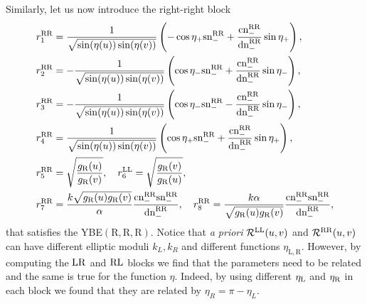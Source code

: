\documentclass[12pt,a4paper]{article}
\numberwithin{equation}{section}
\newcommand{\lR}{\mathcal{R}}
\newcommand{\tR}{\text{R}}
\begin{document}
Similarly, let us now introduce the right-right block
%
\begin{align}
&r_1^{{\rm RR}}=\frac{1}{\sqrt{\sin(\eta(u))\sin(\eta(v))}}\left(-\cos\eta_+\text{sn}^{{\rm RR}}_-+\frac{\text{cn}^{{\rm RR}}_-}{\text{dn}^{{\rm RR}}_-}\sin\eta_+\right),\nonumber\\
&r_2^{{\rm RR}}=-\frac{1}{\sqrt{\sin(\eta(u))\sin(\eta(v))}}\left(\cos\eta_-\text{sn}^{{\rm RR}}_-+\frac{\text{cn}^{{\rm RR}}_-}{\text{dn}^{{\rm RR}}_-}\sin\eta_-\right),\nonumber\\
&r_3^{{\rm RR}}=-\frac{1}{\sqrt{\sin(\eta(u))\sin(\eta(v))}}\left(\cos\eta_-\text{sn}^{{\rm RR}}_--\frac{\text{cn}^{{\rm RR}}_-}{\text{dn}^{{\rm RR}}_-}\sin\eta_-\right),\nonumber\\
&r_4^{{\rm RR}}=\frac{1}{\sqrt{\sin(\eta(u))\sin(\eta(v))}}\left(\cos\eta_+\text{sn}^{{\rm RR}}_-+\frac{\text{cn}^{{\rm RR}}_-}{\text{dn}^{{\rm RR}}_-}\sin\eta_+\right),\nonumber\\
&r_5^{{\rm RR}}=\sqrt{\frac{g_{{\rm R}}(u)}{g_{{\rm R}}(v)}}, \quad r_6^{{\rm LL}}=\sqrt{\frac{g_{{\rm R}}(v)}{g_{{\rm R}}(u)}},\nonumber\\
& r_7^{{\rm RR}}=\frac{k \sqrt{g_{{\rm R}}(u)g_{{\rm R}}(v)}}{\alpha}\frac{\text{cn}^{{\rm RR}}_-\text{sn}^{{\rm RR}}_-}{\text{dn}^{{\rm RR}}_-}, \quad r_8^{{\rm RR}}=\frac{k \alpha}{\sqrt{g_{{\rm R}}(u)g_{{\rm R}}(v)}}\frac{\text{cn}^{{\rm RR}}_-\text{sn}^{{\rm RR}}_-}{\text{dn}^{{\rm RR}}_-},
\label{eq:RRblock8vB}
\end{align}
%
that satisfies the YBE$ (\tR,\tR,\tR) $. Notice that \textit{a priori} $\lR^{{\rm LL}}(u,v)$ and $\lR^{{\rm RR}}(u,v)$ can have different elliptic moduli $k_L,k_R$ and different functions $\eta_{\mathrm{L,R}}$. However, by computing the $ {\rm LR} $ and $ {\rm RL} $ blocks we find that the parameters need to be related and the same is true for the function $\eta$. Indeed, by using different $\eta_{\rm L}$ and $\eta_{\rm R}$ in each block we found that they are related by $\eta_R = \pi-\eta_L$. 
\end{document}
